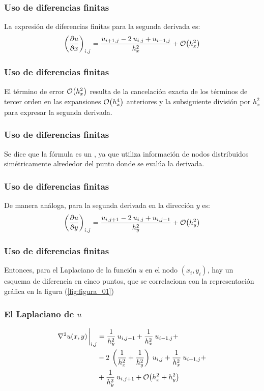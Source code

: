\documentclass[12pt]{beamer}
\begin{document}
\begin{frame}
\frametitle{Uso de diferencias finitas}
La expresión de diferencias finitas para la segunda derivada es:
\pause
\begin{align}
\left( \pdv{u}{x} \right)_{i,j} = \dfrac{u_{i+1, j} - 2 \: u_{i, j} + u_{i-1,j}}{h_{x}^{2}} + \order{h_{x}^{2}}
\label{eq:ecuacion_13_03}
\end{align}
\end{frame}
\begin{frame}
\frametitle{Uso de diferencias finitas}
El término de error $\order{h_{x}^{2}}$ resulta de la cancelación exacta de los términos de tercer orden en las expansiones $\order{h_{x}^{4}}$ anteriores \pause y la subsiguiente división por $h_{x}^{2}$ para expresar la segunda derivada.
\end{frame}
\begin{frame}
\frametitle{Uso de diferencias finitas}
Se dice que la fórmula es un , ya que utiliza información de nodos distribuidos simétricamente alrededor del punto donde se evalúa la derivada.
\end{frame}
\begin{frame}
\frametitle{Uso de diferencias finitas}
De manera análoga, para la segunda derivada en la dirección $y$ es:
\pause
\begin{align}
\left( \pdv{u}{y} \right)_{i,j} = \dfrac{u_{i, j+1} - 2 \: u_{i, j} + u_{i, j-1}}{h_{y}^{2}} + \order{h_{y}^{2}}
\label{eq:ecuacion_13_04}
\end{align}
\end{frame}
\begin{frame}
\frametitle{Uso de diferencias finitas}
Entonces, para el Laplaciano de la función $u$ en el nodo $(x_{i}, y_{i})$, hay un esquema de diferencia en cinco puntos, que se correlaciona con la representación gráfica en la figura (\ref{fig:figura_01})
\end{frame}
\begin{frame}
\frametitle{El Laplaciano de $u$}
\begin{align}
\begin{aligned}[b]
\laplacian u (x,y) \eval_{i,j} &= \dfrac{1}{h_{y}^{2}} \: u_{i, j-1} + \dfrac{1}{h_{x}^{2}} \: u_{i-1, j} + \\
&- 2 \: \left( \dfrac{1}{h_{x}^{2}} + \dfrac{1}{h_{y}^{2}} \right) \: u_{i, j}  + \dfrac{1}{h_{x}^{2}} \: u_{i+1, j}  + \\
&+ \dfrac{1}{h_{y}^{2}} \: u_{i, j+1} + \order{h_{x}^{2} + h_{y}^{2}}
\end{aligned}
\label{eq:ecuacion_13_05}
\end{align}
\end{frame}
\end{document}
